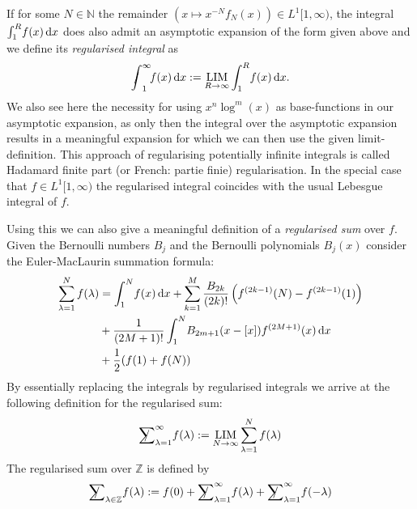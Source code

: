 If for some $N\in\mathbb{N}$ the remainder $(x\mapsto x^{-N}f_N(x))\in
L^1[1,\infty)$, the integral $\Integ[R]{1}{x}{f(x)}$ does also admit an
asymptotic expansion of the form given above and we define its \emph{regularised
integral} as
\begin{align}
  \Regint{x}{f(x)} := \Reglim_{R\to\infty}\Integ[R]{1}{x}{f(x)}.
\end{align}
We also see here the necessity for using $x^n \log^m(x)$ as base-functions in
our asymptotic expansion, as only then the integral over the asymptotic
expansion results in a meaningful expansion for which we can then use the given
limit-definition. This approach of regularising potentially infinite integrals
is called Hadamard finite part (or French: partie finie) regularisation. In the
special case that $f\in L^1[1,\infty)$ the regularised integral coincides with
the usual Lebesgue integral of $f$.

Using this we can also give a meaningful definition of a \emph{regularised sum}
over $f$. Given the Bernoulli numbers $B_j$ and the Bernoulli polynomials
$B_j(x)$ consider the Euler-MacLaurin summation formula:
\begin{align*}
  \sum_{\lambda=1}^N f(\lambda) &= \Integ[N]{1}{x}{f(x)}
  + \sum_{k=1}^M \frac{B_{2k}}{(2k)!}\left(f^{(2k-1)}(N) - f^{(2k-1)}(1)\right)
  \\
  &\mathbin{+} \frac1{(2M + 1)!}\Integ[N]{1}{x}{B_{2m+1}(x-[x])f^{(2M+1)}(x)}
  \\
  &\mathbin{+} \frac12(f(1)+f(N))
\end{align*}
By essentially replacing the integrals by regularised integrals we arrive at the
following definition for the regularised sum:
\begin{align*}
  \Regsum_{\lambda=1}^\infty f(\lambda) := \Reglim_{N\to\infty} \sum_{\lambda=1}^N
  f(\lambda)
\end{align*}
The regularised sum over $\mathbb{Z}$ is defined by
\begin{align*}
  \Regsum_{\lambda\in\mathbb{Z}} f(\lambda) := f(0) + \Regsum_{\lambda=1}^\infty
  f(\lambda) + \Regsum_{\lambda=1}^\infty f(-\lambda)
\end{align*}


